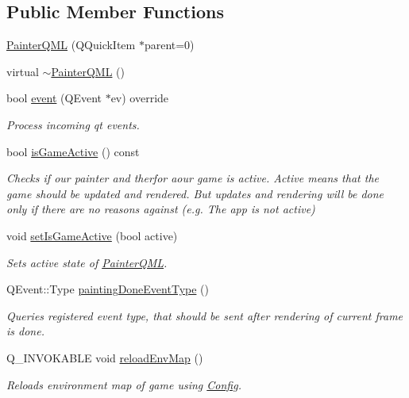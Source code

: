 \subsection*{Public Member Functions}
\begin{DoxyCompactItemize}
\item 
\hyperlink{class_painter_q_m_l_a6ce68afc41c75b1fc74da16890d9f797}{Painter\+Q\+M\+L} (Q\+Quick\+Item $\ast$parent=0)
\item 
virtual \hyperlink{class_painter_q_m_l_a2d0bd68f4b501927f65ec5ff2a06da64}{$\sim$\+Painter\+Q\+M\+L} ()
\item 
bool \hyperlink{class_painter_q_m_l_a69fecccc6056c3ee957219ffd63c193c}{event} (Q\+Event $\ast$ev) override
\begin{DoxyCompactList}\small\item\em Process incoming qt events. \end{DoxyCompactList}\item 
bool \hyperlink{class_painter_q_m_l_aad209e5ccfa2a6aa2a5dcd6148befb5b}{is\+Game\+Active} () const 
\begin{DoxyCompactList}\small\item\em Checks if our painter and therfor aour game is active.  Active means that the game should be updated and rendered. But updates and rendering will be done only if there are no reasons against (e.\+g. The app is not active) \end{DoxyCompactList}\item 
void \hyperlink{class_painter_q_m_l_a303f544708d2041bc25e75db52e89736}{set\+Is\+Game\+Active} (bool active)
\begin{DoxyCompactList}\small\item\em Sets active state of \hyperlink{class_painter_q_m_l}{Painter\+Q\+M\+L}. \end{DoxyCompactList}\item 
Q\+Event\+::\+Type \hyperlink{class_painter_q_m_l_a7715bb2f3d638ff3d5e6e602a427b413}{painting\+Done\+Event\+Type} ()
\begin{DoxyCompactList}\small\item\em Queries registered event type, that should be sent after rendering of current frame is done. \end{DoxyCompactList}\item 
Q\+\_\+\+I\+N\+V\+O\+K\+A\+B\+L\+E void \hyperlink{class_painter_q_m_l_a3dede2a01c6e90c51c9bfe69ac0d83bd}{reload\+Env\+Map} ()
\begin{DoxyCompactList}\small\item\em Reloads environment map of game using \hyperlink{class_config}{Config}. \end{DoxyCompactList}\item 

\end{DoxyCompactItemize}
